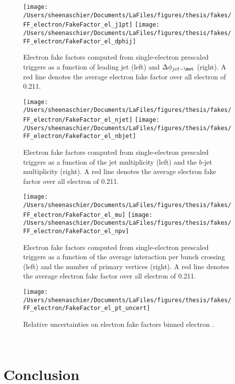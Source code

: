 \begin{figure}[tbp]
  \centering
  \texttt{[image: /Users/sheenaschier/Documents/LaFiles/figures/thesis/fakes/FF\_electron/FakeFactor\_el\_j1pt]}
  \texttt{[image: /Users/sheenaschier/Documents/LaFiles/figures/thesis/fakes/FF\_electron/FakeFactor\_el\_dphij]}\\
  \caption{Electron fake factors computed from single-electron prescaled triggers as a function of leading jet \pt{} (left) and $\Delta\phi_{jet-\met}$ (right). A red line denotes the average electron fake factor over all electron \pt{} of 0.211.}
  \label{fig:elec_FF_hadronic}
\end{figure}

\begin{figure}[tbp]
  \centering
  \texttt{[image: /Users/sheenaschier/Documents/LaFiles/figures/thesis/fakes/FF\_electron/FakeFactor\_el\_njet]}
  \texttt{[image: /Users/sheenaschier/Documents/LaFiles/figures/thesis/fakes/FF\_electron/FakeFactor\_el\_nbjet]}\\
  \caption{Electron fake factors computed from single-electron prescaled triggers as a function of the jet multiplicity (left) and the $b$-jet multiplicity (right). A red line denotes the average electron fake factor over all electron \pt{} of 0.211.}
  \label{fig:elec_FF_njet}
\end{figure}


\begin{figure}[tbp]
  \centering
  \texttt{[image: /Users/sheenaschier/Documents/LaFiles/figures/thesis/fakes/FF\_electron/FakeFactor\_el\_mu]}
  \texttt{[image: /Users/sheenaschier/Documents/LaFiles/figures/thesis/fakes/FF\_electron/FakeFactor\_el\_npv]}\\
  \caption{Electron fake factors computed from single-electron prescaled triggers as a function of the average interaction per bunch crossing (left) and the number of primary vertices (right). A red line denotes the average electron fake factor over all electron \pt{} of 0.211.}
  \label{fig:elec_FF_pileup}
\end{figure}

\begin{figure}[tbp]
  \centering
  \texttt{[image: /Users/sheenaschier/Documents/LaFiles/figures/thesis/fakes/FF\_electron/FakeFactor\_el\_pt\_uncert]}\\
  \caption{Relative uncertainties on electron fake factors binned electron \pt{}.}
  \label{fig:elec_FF_rel_uncert}
\end{figure}

 \FloatBarrier




 
 \ \section{Conclusion}
